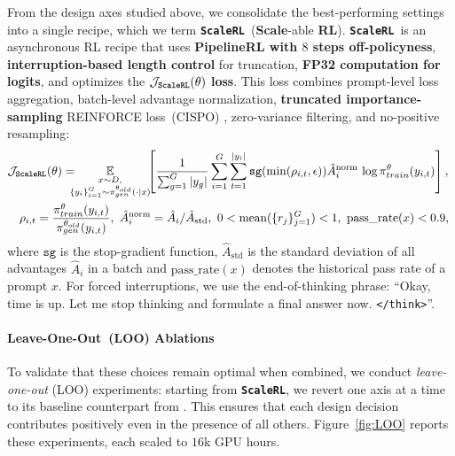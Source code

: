 \documentclass[]{fairmeta} %
\newcommand{\scalerl}{\texttt{\textbf{ScaleRL}}}
\begin{document}
From the design axes studied above, we consolidate the best-performing settings into a single recipe, which we term \scalerl\ (\textbf{Scale}-able \textbf{RL}). 
\scalerl\ is an asynchronous RL recipe that uses \textbf{PipelineRL with $8$ steps off-policyness}, \textbf{interruption-based length control} for truncation, \textbf{FP32 computation for logits}, and optimizes the $\mathbf{\mathcal{J}_{\mathrm{\scalerl}}(\theta)}$ \textbf{loss}. This loss combines prompt-level loss aggregation, batch-level advantage normalization, \textbf{truncated importance-sampling} REINFORCE loss~(CISPO) , zero-variance filtering, and no-positive resampling: 
\begin{align*}
& \mathcal{J}_{\mathrm{\scalerl}}(\theta) 
=\hspace{-0.7em} \underset{\substack{x \sim D, \\ \{y_i\}_{i=1}^G \sim \pi_{gen}^{\theta_{old}}(\cdot \mid x)}}{\mathbb{E}}
\hspace{-0.4em}
\left[ \frac{1}{\sum_{g=1}^{G} |y_g|} \sum_{i=1}^G \sum_{t=1}^{|y_i|} \texttt{sg}(\mathrm{min}(\rho_{i, t}, \epsilon)) \hat{A}_{i}^{\text{norm}} \, \log\pi_{train}^\theta(y_{i,t})\right], \\
& \quad  \rho_{i, t}=\frac{\pi_{train}^\theta(y_{i,t})}{\pi_{gen}^{\theta_{old}}(y_{i,t})},\ \hat{A}^{\mathrm{norm}}_{i}
= \hat{A}_{i}/\hat{A}_{\text{std}},\ 0 <  \mathrm{mean}(\{r_j\}_{j=1}^G) < 1,\  \text{pass\_rate}(x) < 0.9,\ 
\end{align*}
where $\texttt{sg}$ is the stop-gradient function, $\hat{A}_{\text{std}}$ is the standard deviation of all advantages $\hat{A}_{i}$ in a batch and $\text{pass\_rate}(x)$ denotes the historical pass rate of a prompt $x$.  For forced interruptions, we use the end-of-thinking phrase: ``Okay, time is up. Let me stop thinking and formulate a final answer now. \texttt{</think>}''.


\paragraph{Leave-One-Out~(LOO) Ablations}
To validate that these choices remain optimal when combined, we conduct \emph{leave-one-out} (LOO) experiments: starting from \scalerl, we revert one axis at a time to its baseline counterpart from . 
This ensures that each design decision contributes positively even in the presence of all others. Figure~\ref{fig:LOO} reports these experiments, each scaled to $16$k GPU hours.
\end{document}
